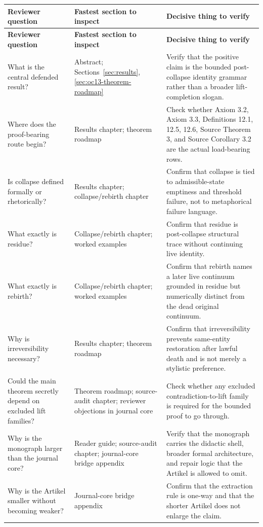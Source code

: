 \begin{longtable}{p{3.4cm} p{4.4cm} p{5.7cm}}
\toprule
\textbf{Reviewer question} & \textbf{Fastest section to inspect} & \textbf{Decisive thing to verify} \\
\midrule
\endfirsthead
\toprule
\textbf{Reviewer question} & \textbf{Fastest section to inspect} & \textbf{Decisive thing to verify} \\
\midrule
\endhead
\bottomrule
\endfoot
What is the central defended result? & Abstract; Sections~\ref{sec:results}, \ref{sec:oc13-theorem-roadmap} & Verify that the positive claim is the bounded post-collapse identity grammar rather than a broader lift-completion slogan. \\
Where does the proof-bearing route begin? & Results chapter; theorem roadmap & Check whether Axiom 3.2, Axiom 3.3, Definitions 12.1, 12.5, 12.6, Source Theorem 3, and Source Corollary 3.2 are the actual load-bearing rows. \\
Is collapse defined formally or rhetorically? & Results chapter; collapse/rebirth chapter & Confirm that collapse is tied to admissible-state emptiness and threshold failure, not to metaphorical failure language. \\
What exactly is residue? & Collapse/rebirth chapter; worked examples & Confirm that residue is post-collapse structural trace without continuing live identity. \\
What exactly is rebirth? & Collapse/rebirth chapter; worked examples & Confirm that rebirth names a later live continuum grounded in residue but numerically distinct from the dead original continuum. \\
Why is irreversibility necessary? & Results chapter; theorem roadmap & Confirm that irreversibility prevents same-entity restoration after lawful death and is not merely a stylistic preference. \\
Could the main theorem secretly depend on excluded lift families? & Theorem roadmap; source-audit chapter; reviewer objections in journal core & Check whether any excluded contradiction-to-lift family is required for the bounded proof to go through. \\
Why is the monograph larger than the journal core? & Reader guide; source-audit chapter; journal-core bridge appendix & Verify that the monograph carries the didactic shell, broader formal architecture, and repair logic that the Artikel is allowed to omit. \\
Why is the Artikel smaller without becoming weaker? & Journal-core bridge appendix & Confirm that the extraction rule is one-way and that the shorter Artikel does not enlarge the claim. \\

\end{longtable}
